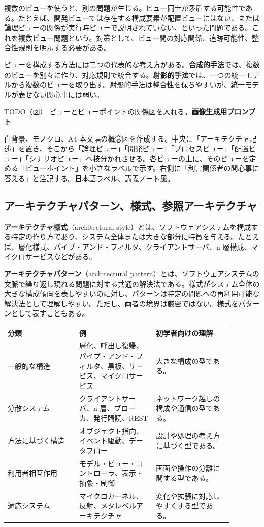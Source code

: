 \documentclass[a4paper,11pt]{ltjsarticle}
\newcommand{\todofig}[2]{\begin{statementbox}{TODO（図） #1}\textbf{画像生成用プロンプト}\par #2\end{statementbox}}
\newcommand{\keyterm}[1]{\textbf{#1}}
\newcommand{\en}[1]{（#1）}
\begin{document}
複数のビューを使うと、別の問題が生じる。ビュー同士が矛盾する可能性である。たとえば、開発ビューでは存在する構成要素が配置ビューにはない、または論理ビューの関係が実行時ビューで説明されていない、といった問題である。これを複数ビュー問題という。対策として、ビュー間の対応関係、追跡可能性、整合性規則を明示する必要がある。

ビューを構成する方法には二つの代表的な考え方がある。\keyterm{合成的手法}では、複数のビューを別々に作り、対応規則で統合する。\keyterm{射影的手法}では、一つの統一モデルから複数のビューを取り出す。射影的手法は整合性を保ちやすいが、統一モデルが表せない関心事には弱い。

\todofig{ビューとビューポイントの関係図を入れる。}{白背景、モノクロ、A4 本文幅の概念図を作成する。中央に「アーキテクチャ記述」を置き、そこから「論理ビュー」「開発ビュー」「プロセスビュー」「配置ビュー」「シナリオビュー」へ枝分かれさせる。各ビューの上に、そのビューを定める「ビューポイント」を小さなラベルで示す。右側に「利害関係者の関心事に答える」と注記する。日本語ラベル、講義ノート風。}

\subsection{アーキテクチャパターン、様式、参照アーキテクチャ}
\keyterm{アーキテクチャ様式}\en{architectural style}とは、ソフトウェアシステムを構成する特定の作り方であり、システム全体または大きな部分に特徴を与える。たとえば、層化様式、パイプ・アンド・フィルタ、クライアントサーバ、n 層構成、マイクロサービスなどがある。

\keyterm{アーキテクチャパターン}\en{architectural pattern}とは、ソフトウェアシステムの文脈で繰り返し現れる問題に対する共通の解決法である。様式がシステム全体の大きな構成傾向を表しやすいのに対し、パターンは特定の問題への再利用可能な解決法として理解しやすい。ただし、両者の境界は厳密ではない。様式をパターンとして表すこともある。

\begin{longtable}{P{0.28\linewidth}P{0.30\linewidth}P{0.30\linewidth}}
\toprule
分類 & 例 & 初学者向けの理解 \\
\midrule
一般的な構造 & 層化、呼出し復帰、パイプ・アンド・フィルタ、黒板、サービス、マイクロサービス & 大きな構成の型である。 \\
分散システム & クライアントサーバ、n 層、ブローカ、発行購読、REST & ネットワーク越しの構成や通信の型である。 \\
方法に基づく構造 & オブジェクト指向、イベント駆動、データフロー & 設計や処理の考え方に基づく型である。 \\
利用者相互作用 & モデル・ビュー・コントローラ、表示・抽象・制御 & 画面や操作の分離に関する型である。 \\
適応システム & マイクロカーネル、反射、メタレベルアーキテクチャ & 変化や拡張に対応しやすくする型である。 \\
\bottomrule
\end{longtable}
\end{document}
